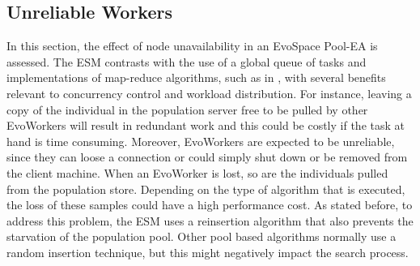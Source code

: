 \subsection{Unreliable Workers}
In this section, the effect of node unavailability in an EvoSpace Pool-EA is assessed.
The ESM contrasts with the use of a global queue of tasks and implementations
of map-reduce algorithms, such as in \cite{fazenda2012}, with several benefits relevant to
concurrency control and workload distribution. 
For instance, leaving a copy of the individual in the population server
free to be pulled by other EvoWorkers will result in redundant work and this
could be costly if the task at hand is time consuming. Moreover, EvoWorkers are expected
to be unreliable, since they can loose a connection or could simply shut down or be removed from the client machine.
When an EvoWorker is lost, so are the individuals pulled from the population store.
Depending on the type of algorithm that is executed, the loss of these samples could have a high performance cost.
As stated before, to address this problem, the ESM uses a reinsertion algorithm that also prevents
the starvation of the population pool. Other pool based algorithms normally use
a random insertion technique, but this might negatively impact the search process.

